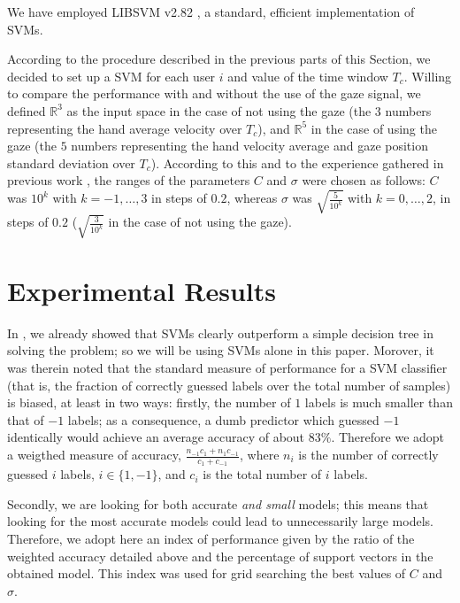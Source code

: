 \documentclass[jou,a4paper,notxfonts]{apa}
\def\RR{\mathbb{R}}
\begin{document}
We have employed LIBSVM v2.82 \cite{ChangL01}, a standard, efficient
implementation of SVMs.

According to the procedure described in the previous parts of this
Section, we decided to set up a SVM for each user $i$ and value of the
time window $T_c$. Willing to compare the performance with and without
the use of the gaze signal, we defined $\RR^{3}$ as the input space in
the case of not using the gaze (the $3$ numbers representing the hand
average velocity over $T_c$), and $\RR^{5}$ in the case of using the
gaze (the $5$ numbers representing the hand velocity average and gaze
position standard deviation over $T_c$). According to this and to the
experience gathered in previous work \cite{clea07}, the ranges of the
parameters $C$ and $\sigma$ were chosen as follows: $C$ was $10^k$
with $k=-1,\ldots,3$ in steps of $0.2$, whereas $\sigma$ was
$\sqrt{\frac{5}{10^{k}}}$ with $k=0,\ldots,2$, in steps of $0.2$
($\sqrt{\frac{3}{10^{k}}}$ in the case of not using the gaze).

\section{Experimental Results}

\label{sec:res}

In \cite{clea07}, we already showed that SVMs clearly outperform a
simple decision tree in solving the problem; so we will be using SVMs
alone in this paper. Morover, it was therein noted that the standard
measure of performance for a SVM classifier (that is, the fraction of
correctly guessed labels over the total number of samples) is biased,
at least in two ways: firstly, the number of $1$ labels is much
smaller than that of $-1$ labels; as a consequence, a dumb predictor
which guessed $-1$ identically would achieve an average accuracy of
about $83\%$. Therefore we adopt a weigthed measure of accuracy,
$\frac{n_{-1} c_1 + n_1 c_{-1}}{c_1+c_{-1}}$, where $n_i$ is the
number of correctly guessed $i$ labels, $i \in \{1,-1\}$, and $c_i$ is
the total number of $i$ labels.

Secondly, we are looking for both accurate \emph{and small} models;
this means that looking for the most accurate models could lead to
unnecessarily large models. Therefore, we adopt here an index of
performance given by the ratio of the weighted accuracy detailed above
and the percentage of support vectors in the obtained model. This
index was used for grid searching the best values of $C$ and $\sigma$.
\end{document}
